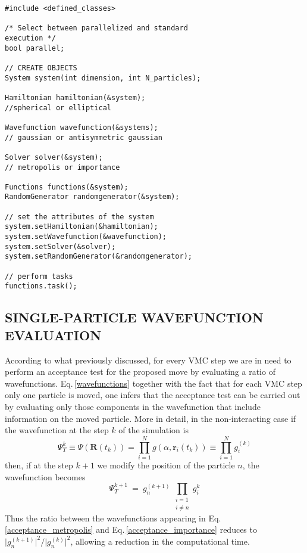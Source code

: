 \begin{verbatim}
#include <defined_classes>

/* Select between parallelized and standard 
execution */
bool parallel;

// CREATE OBJECTS
System system(int dimension, int N_particles);

Hamiltonian hamiltonian(&system);
//spherical or elliptical

Wavefunction wavefunction(&systems);
// gaussian or antisymmetric gaussian

Solver solver(&system);
// metropolis or importance

Functions functions(&system);
RandomGenerator randomgenerator(&system);

// set the attributes of the system
system.setHamiltonian(&hamiltonian);
system.setWavefunction(&wavefunction);
system.setSolver(&solver);
system.setRandomGenerator(&randomgenerator);

// perform tasks
functions.task();
\end{verbatim}



\subsection{SINGLE-PARTICLE WAVEFUNCTION EVALUATION}
According to what previously discussed, for every VMC step we are in need to perform an acceptance test for the proposed move by evaluating a ratio of wavefunctions. Eq.\,\ref{wavefunctions} together with the fact that for each VMC step only one particle is moved, one infers that the acceptance test can be carried out by evaluating only those components in the wavefunction that include information on the moved particle. More in detail, in the non-interacting case if the wavefunction at the step $k$ of the simulation is
\begin{equation*}
    \Psi_T^{k} \equiv \Psi(\bm{R}(t_k)) = \prod_{i=1}^{N} g(\alpha, \bm{r}_i(t_k)) \equiv \prod_{i=1}^N g_i^{(k)}
\end{equation*}
then, if at the step $k+1$ we modify the position of the particle $n$, the wavefunction becomes
\begin{equation*}
    \Psi_T^{k+1} \ = \ g_n^{(k+1)} \, \prod_{\substack{i=1\\ i \neq n}} g_i^{k}
\end{equation*}
Thus the ratio between the wavefunctions appearing in Eq.\,\ref{acceptance_metropolis} and Eq.\,\ref{acceptance_importance} reduces to $\vert g_n^{(k+1)} \vert^2 / \vert g_n^{(k)} \vert^2$, allowing a reduction in the computational time. 


